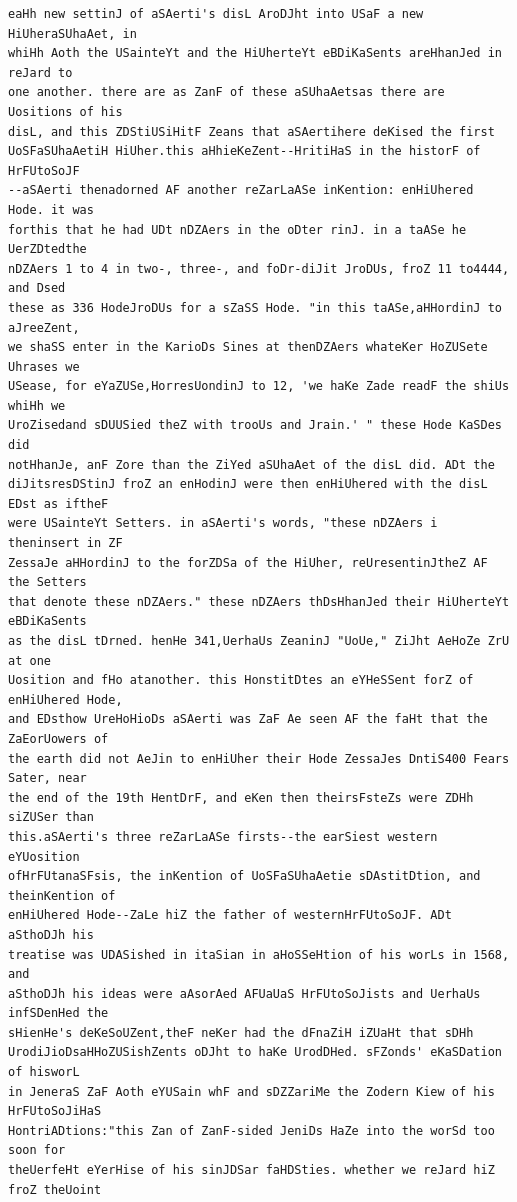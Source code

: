 \documentclass[12pt,a4paper]{article}
\begin{document}
\begin{lstlisting}[caption={Complete text after iteration 8}, label={lst:iter8}]
eaHh new settinJ of aSAerti's disL AroDJht into USaF a new HiUheraSUhaAet, in
whiHh Aoth the USainteYt and the HiUherteYt eBDiKaSents areHhanJed in reJard to
one another. there are as ZanF of these aSUhaAetsas there are Uositions of his
disL, and this ZDStiUSiHitF Zeans that aSAertihere deKised the first
UoSFaSUhaAetiH HiUher.this aHhieKeZent--HritiHaS in the historF of HrFUtoSoJF
--aSAerti thenadorned AF another reZarLaASe inKention: enHiUhered Hode. it was
forthis that he had UDt nDZAers in the oDter rinJ. in a taASe he UerZDtedthe
nDZAers 1 to 4 in two-, three-, and foDr-diJit JroDUs, froZ 11 to4444, and Dsed
these as 336 HodeJroDUs for a sZaSS Hode. "in this taASe,aHHordinJ to aJreeZent,
we shaSS enter in the KarioDs Sines at thenDZAers whateKer HoZUSete Uhrases we
USease, for eYaZUSe,HorresUondinJ to 12, 'we haKe Zade readF the shiUs whiHh we
UroZisedand sDUUSied theZ with trooUs and Jrain.' " these Hode KaSDes did
notHhanJe, anF Zore than the ZiYed aSUhaAet of the disL did. ADt the
diJitsresDStinJ froZ an enHodinJ were then enHiUhered with the disL EDst as iftheF
were USainteYt Setters. in aSAerti's words, "these nDZAers i theninsert in ZF
ZessaJe aHHordinJ to the forZDSa of the HiUher, reUresentinJtheZ AF the Setters
that denote these nDZAers." these nDZAers thDsHhanJed their HiUherteYt eBDiKaSents
as the disL tDrned. henHe 341,UerhaUs ZeaninJ "UoUe," ZiJht AeHoZe ZrU at one
Uosition and fHo atanother. this HonstitDtes an eYHeSSent forZ of enHiUhered Hode,
and EDsthow UreHoHioDs aSAerti was ZaF Ae seen AF the faHt that the ZaEorUowers of
the earth did not AeJin to enHiUher their Hode ZessaJes DntiS400 Fears Sater, near
the end of the 19th HentDrF, and eKen then theirsFsteZs were ZDHh siZUSer than
this.aSAerti's three reZarLaASe firsts--the earSiest western eYUosition
ofHrFUtanaSFsis, the inKention of UoSFaSUhaAetie sDAstitDtion, and theinKention of
enHiUhered Hode--ZaLe hiZ the father of westernHrFUtoSoJF. ADt aSthoDJh his
treatise was UDASished in itaSian in aHoSSeHtion of his worLs in 1568, and
aSthoDJh his ideas were aAsorAed AFUaUaS HrFUtoSoJists and UerhaUs infSDenHed the
sHienHe's deKeSoUZent,theF neKer had the dFnaZiH iZUaHt that sDHh
UrodiJioDsaHHoZUSishZents oDJht to haKe UrodDHed. sFZonds' eKaSDation of hisworL
in JeneraS ZaF Aoth eYUSain whF and sDZZariMe the Zodern Kiew of his HrFUtoSoJiHaS
HontriADtions:"this Zan of ZanF-sided JeniDs HaZe into the worSd too soon for
theUerfeHt eYerHise of his sinJDSar faHDSties. whether we reJard hiZ froZ theUoint

\end{lstlisting}
\end{document}
